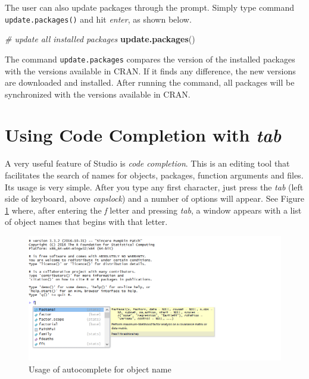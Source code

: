 \documentclass[11pt,]{book}
\newenvironment{Shaded}{\begin{snugshade}}{\end{snugshade}}
\newcommand{\KeywordTok}[1]{\textcolor[rgb]{0.27,0.27,0.27}{\textbf{#1}}}
\newcommand{\CommentTok}[1]{\textcolor[rgb]{0.56,0.35,0.01}{\textit{#1}}}
\newcommand{\NormalTok}[1]{#1}
\begin{document}
The user can also update packages through the prompt. Simply type
command \texttt{update.packages()} and hit \emph{enter}, as shown below.

\begin{Shaded}
\begin{Highlighting}[]
\CommentTok{# update all installed packages}
\KeywordTok{update.packages}\NormalTok{()}
\end{Highlighting}
\end{Shaded}

The command \texttt{update.packages} compares the version of the
installed packages with the versions available in CRAN. If it finds any
difference, the new versions are downloaded and installed. After running
the command, all packages will be synchronized with the versions
available in CRAN.

\section{\texorpdfstring{Using Code Completion with
\emph{tab}}{Using Code Completion with tab}}\label{using-code-completion-with-tab}

A very useful feature of Studio is \emph{code completion}. This is an
editing tool that facilitates the search of names for objects, packages,
function arguments and files. Its usage is very simple. After you type
any first character, just press the \emph{tab} (left side of keyboard,
above \emph{capslock}) and a number of options will appear. See Figure
\ref{fig:autocomplete} where, after entering the \emph{f} letter and
pressing \emph{tab}, a window appears with a list of object names that
begins with that letter. 

\begin{figure}[!htbp]

{\centering \includegraphics[width=1\linewidth]{figs/autocomplete} 

}

\caption{Usage of autocomplete for object name}\label{fig:autocomplete}
\end{figure}
\end{document}
